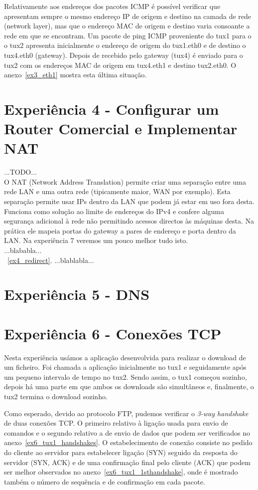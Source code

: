 \documentclass[11pt,a4paper,reqno]{report}
\numberwithin{equation}{section}
\begin{document}
Relativamente aos endereços dos pacotes ICMP é possível verificar que apresentam sempre o mesmo endereço IP de origem e destino na camada de rede (network layer), mas que o endereço MAC de origem e destino varia consoante a rede em que se encontram. Um pacote de ping ICMP proveniente do tux1 para o o tux2 apresenta inicialmente o endereço de origem do tux1.eth0 e de destino o tux4.eth0 (gateway). Depois de recebido pelo gateway (tux4) é enviado para o tux2 com os endereços MAC de origem em tux4.eth1 e destino tux2.eth0. O anexo~\ref{ex3_eth1} mostra esta última situação.



\section{Experiência 4 - Configurar um Router Comercial e Implementar NAT}
...TODO...\\
O NAT (Network Address Translation) permite criar uma separação entre uma rede LAN e uma outra rede (tipicamente maior, WAN por exemplo). Esta separação permite usar IPs dentro da LAN que podem já estar em uso fora desta. Funciona como solução ao limite de endereços do IPv4 e confere alguma segurança adicional à rede não permitindo acessos directos às máquinas desta. Na prática ele mapeia portas do gateway a pares de endereço e porta dentro da LAN. Na experiência 7 veremos um pouco melhor tudo isto.\\
...blababla...\\
~\ref{ex4_redirect}.
...blablabla...\\
\section{Experiência 5 - DNS}

\section{Experiência 6 - Conexões TCP}

Nesta experiência usámos a aplicação desenvolvida para realizar o download de um ficheiro. Foi chamada a aplicação inicialmente no tux1 e seguidamente após um pequeno intervalo de tempo no tux2. Sendo assim, o tux1 começou sozinho, depois há uma parte em que ambos os downloads são simultâneos e, finalmente, o tux2 termina o download sozinho.

Como esperado, devido ao protocolo FTP, pudemos verificar o \emph{3-way handshake} de duas conexões TCP. O primeiro relativo à ligação usada para envio de comandos e o segundo relativo a de envio de dados que podem ser verificados no anexo~\ref{ex6_tux1_handshakes}. O estabelecimento de conexão consiste no pedido do cliente ao servidor para estabelecer ligação (SYN) seguido da resposta do servidor (SYN, ACK) e de uma confirmação final pelo cliente (ACK) que podem ser melhor observados no anexo~\ref{ex6_tux1_1sthandshake}, onde é mostrado também o número de sequência e de confirmação em cada pacote. \\
\end{document}
